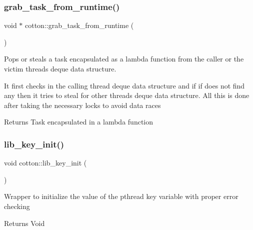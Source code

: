 \subsubsection{\texorpdfstring{grab\+\_\+task\+\_\+from\+\_\+runtime()}{grab\_task\_from\_runtime()}}
{\footnotesize\ttfamily void $\ast$ cotton\+::grab\+\_\+task\+\_\+from\+\_\+runtime (\begin{DoxyParamCaption}{ }\end{DoxyParamCaption})}

Pops or steals a task encapsulated as a lambda function from the caller or the victim thread\textquotesingle{}s deque data structure.

It first checks in the calling thread deque data structure and if if does not find any then it tries to steal for other threads\textquotesingle{} deque data structure. All this is done after taking the necessary locks to avoid data races

\begin{DoxyReturn}{Returns}
Task encapsulated in a lambda function 
\end{DoxyReturn}
\mbox{\label{cotton-runtime_8h_file_a4ea9036584fa3bd86fe8626dc05d295f}} 
\subsubsection{\texorpdfstring{lib\+\_\+key\+\_\+init()}{lib\_key\_init()}}
{\footnotesize\ttfamily void cotton\+::lib\+\_\+key\+\_\+init (\begin{DoxyParamCaption}{ }\end{DoxyParamCaption})}

Wrapper to initialize the value of the pthread key variable with proper error checking

\begin{DoxyReturn}{Returns}
Void 
\end{DoxyReturn}
\mbox{\label{cotton-runtime_8h_file_a803285410d295a5f32238ad2dfc241a5}} 
